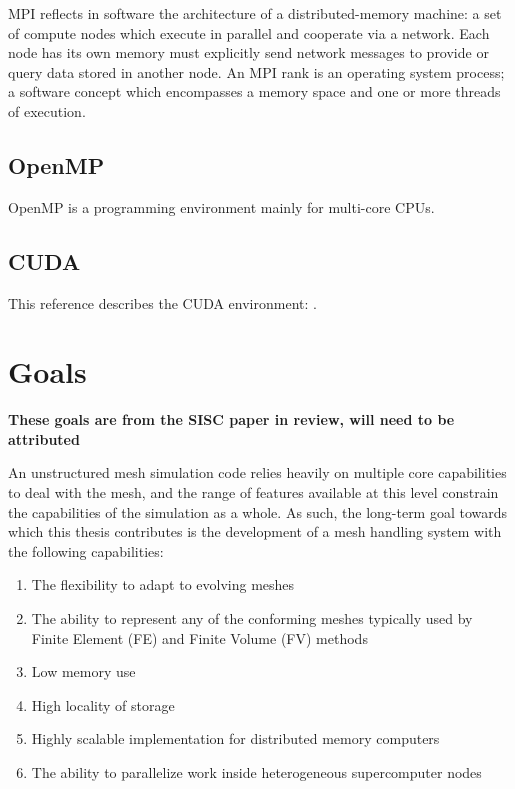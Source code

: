 MPI reflects in software the architecture of a distributed-memory
machine: a set of compute nodes which execute in parallel
and cooperate via a network.
Each node has its own memory must explicitly send network messages to provide
or query data stored in another node.
An MPI rank is an operating system process; a software concept
which encompasses a memory space and one or more threads of execution.

\subsection{OpenMP}

OpenMP is a programming environment mainly for multi-core CPUs.

\subsection{CUDA}

This reference describes the CUDA environment: \cite{nickolls2008scalable}.

\section{Goals}
\label{sec:intro_goals}

{\bf These goals are from the SISC paper in review, will
need to be attributed}

An unstructured mesh simulation code relies heavily on
multiple core capabilities to deal with the mesh,
and the range of features available at this level constrain
the capabilities of the simulation as a whole.
As such, the long-term goal towards which this thesis
contributes is the development of a mesh handling system
with the following capabilities:

\begin{enumerate}
\item The flexibility to adapt to evolving meshes
\item The ability to represent any of the conforming meshes typically
used by Finite Element (FE) and Finite Volume (FV) methods
\item Low memory use
\item High locality of storage
\item Highly scalable implementation for distributed memory computers
\item The ability to parallelize work inside heterogeneous
supercomputer nodes
\end{enumerate}

